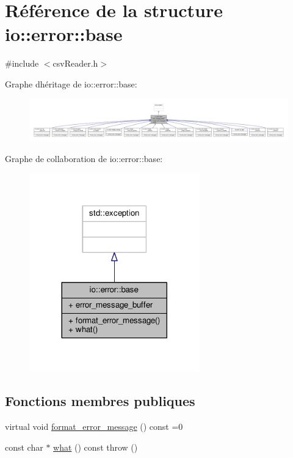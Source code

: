 \hypertarget{structio_1_1error_1_1base}{}\section{Référence de la structure io\+:\+:error\+:\+:base}
\label{structio_1_1error_1_1base}


{\ttfamily \#include $<$csv\+Reader.\+h$>$}



Graphe d\textquotesingle{}héritage de io\+:\+:error\+:\+:base\+:
\nopagebreak
\begin{figure}[H]
\begin{center}
\leavevmode
\includegraphics[width=350pt]{structio_1_1error_1_1base__inherit__graph}
\end{center}
\end{figure}


Graphe de collaboration de io\+:\+:error\+:\+:base\+:
\nopagebreak
\begin{figure}[H]
\begin{center}
\leavevmode
\includegraphics[width=209pt]{structio_1_1error_1_1base__coll__graph}
\end{center}
\end{figure}
\subsection*{Fonctions membres publiques}
\begin{DoxyCompactItemize}
\item 
virtual void \hyperlink{structio_1_1error_1_1base_a7d9ff6a31b716a24f056cf8a3e15191d}{format\+\_\+error\+\_\+message} () const =0
\item 
const char $\ast$ \hyperlink{structio_1_1error_1_1base_a35483dfbe91cea45cfa7c5613e83e5ef}{what} () const  throw ()
\end{DoxyCompactItemize}
